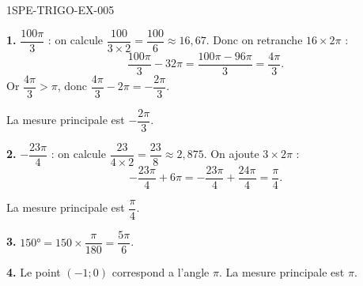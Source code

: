 \begin{corrige}{1SPE-TRIGO-EX-005}

\textbf{1.} $\dfrac{100\pi}{3}$ : on calcule $\dfrac{100}{3 \times 2} = \dfrac{100}{6} \approx 16{,}67$. Donc on retranche $16 \times 2\pi$ :
\[
\dfrac{100\pi}{3} - 32\pi = \dfrac{100\pi - 96\pi}{3} = \dfrac{4\pi}{3}.
\]
Or $\dfrac{4\pi}{3} > \pi$, donc $\dfrac{4\pi}{3} - 2\pi = -\dfrac{2\pi}{3}$.

La mesure principale est $-\dfrac{2\pi}{3}$.

\medskip
\textbf{2.} $-\dfrac{23\pi}{4}$ : on calcule $\dfrac{23}{4 \times 2} = \dfrac{23}{8} \approx 2{,}875$. On ajoute $3 \times 2\pi$ :
\[
-\dfrac{23\pi}{4} + 6\pi = -\dfrac{23\pi}{4} + \dfrac{24\pi}{4} = \dfrac{\pi}{4}.
\]

La mesure principale est $\dfrac{\pi}{4}$.

\medskip
\textbf{3.} $150° = 150 \times \dfrac{\pi}{180} = \dfrac{5\pi}{6}$.

\medskip
\textbf{4.} Le point $(-1;0)$ correspond a l'angle $\pi$. La mesure principale est $\pi$.

\end{corrige}
